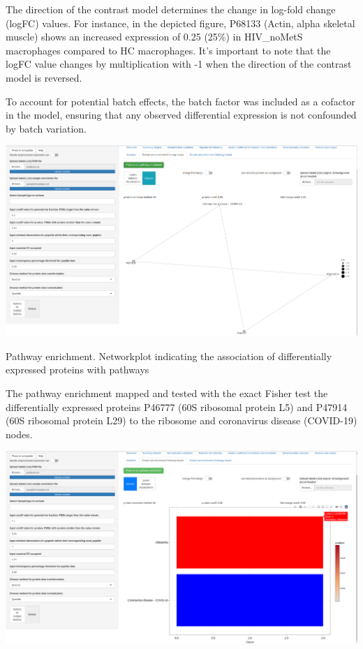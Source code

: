 \documentclass[
  11pt,
]{article}
\let\origfigure\figure
\begin{document}
The direction of the contrast model determines the change in log-fold
change (logFC) values. For instance, in the depicted figure, P68133
(Actin, alpha skeletal muscle) shows an increased expression of 0.25
(25\%) in HIV\_noMetS macrophages compared to HC macrophages. It's
important to note that the logFC value changes by multiplication with -1
when the direction of the contrast model is reversed.

To account for potential batch effects, the batch factor was included as
a cofactor in the model, ensuring that any observed differential
expression is not confounded by batch variation.

\newpage
\bgroup  \origfigure[H] 

{\centering \includegraphics[width=0.9\linewidth]{screenshots/path_enrich_nw} 

}

\caption{Pathway enrichment. Networkplot indicating the association of differentially expressed proteins with pathways}\label{fig:ui_path_enrich_nw}
 \endfigure\egroup

The pathway enrichment mapped and tested with the exact Fisher test
\citep{Sprent2011} the differentially expressed proteins P46777 (60S
ribosomal protein L5) and P47914 (60S ribosomal protein L29) to the
ribosome and coronavirus disease (COVID-19) nodes.

\newpage
\bgroup  \origfigure[H] 

{\centering \includegraphics[width=0.9\linewidth]{screenshots/path_enrich_bar} 

}
\end{document}
